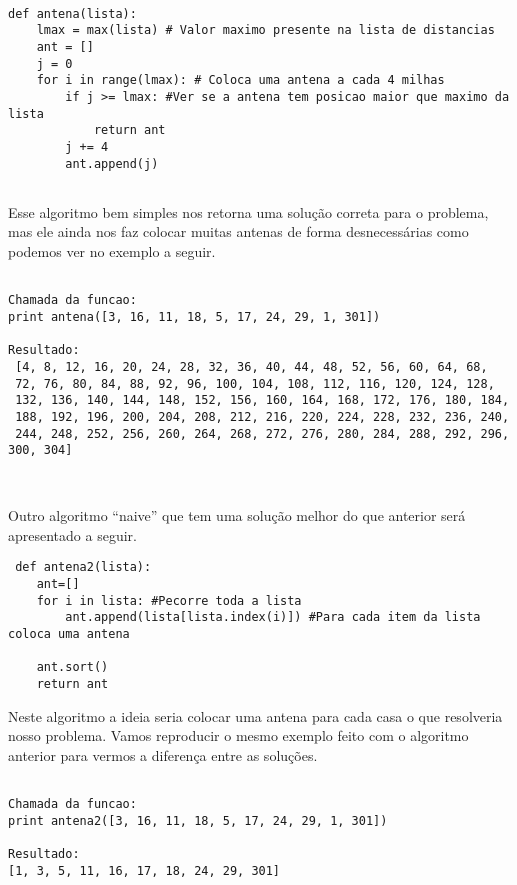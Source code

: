 \documentclass[11pt]{article}
\begin{document}
\begin{verbatim}
 
def antena(lista):
    lmax = max(lista) # Valor maximo presente na lista de distancias
    ant = []
    j = 0
    for i in range(lmax): # Coloca uma antena a cada 4 milhas
        if j >= lmax: #Ver se a antena tem posicao maior que maximo da lista
            return ant
        j += 4
        ant.append(j)
          
\end{verbatim}

Esse algoritmo bem simples nos retorna uma solução correta para o problema, mas ele ainda nos faz colocar muitas antenas 
de forma desnecessárias como podemos ver no exemplo a seguir.

\begin{verbatim}

Chamada da funcao:
print antena([3, 16, 11, 18, 5, 17, 24, 29, 1, 301])

Resultado:
 [4, 8, 12, 16, 20, 24, 28, 32, 36, 40, 44, 48, 52, 56, 60, 64, 68, 
 72, 76, 80, 84, 88, 92, 96, 100, 104, 108, 112, 116, 120, 124, 128, 
 132, 136, 140, 144, 148, 152, 156, 160, 164, 168, 172, 176, 180, 184, 
 188, 192, 196, 200, 204, 208, 212, 216, 220, 224, 228, 232, 236, 240, 
 244, 248, 252, 256, 260, 264, 268, 272, 276, 280, 284, 288, 292, 296, 300, 304]

 
\end{verbatim}


Outro algoritmo ``naive'' que tem uma solução melhor do que anterior será apresentado a seguir.

\begin{verbatim}
 def antena2(lista):
    ant=[]
    for i in lista: #Pecorre toda a lista
        ant.append(lista[lista.index(i)]) #Para cada item da lista coloca uma antena

    ant.sort()
    return ant
\end{verbatim}

Neste algoritmo a ideia seria colocar uma antena para cada casa o que resolveria nosso problema.
Vamos reproducir o mesmo exemplo feito com o algoritmo anterior para vermos a diferença entre as soluções.

\begin{verbatim}

Chamada da funcao:
print antena2([3, 16, 11, 18, 5, 17, 24, 29, 1, 301])

Resultado:
[1, 3, 5, 11, 16, 17, 18, 24, 29, 301]

 
\end{verbatim}
\end{document}
